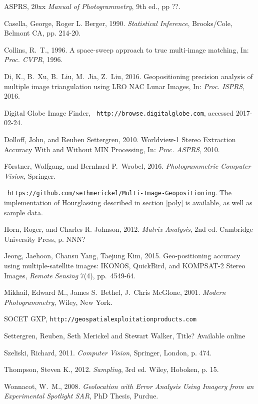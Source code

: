 \documentclass[10pt]{amsart}
\begin{document}
\begin{thebibliography}{99} %

ASPRS, 20xx {\em Manual of Photogrammetry}, 9th ed., pp ??.

 Casella, George, Roger L. Berger, 1990. {\em Statistical
  Inference}, Brooks/Cole, Belmont CA, pp. 214-20.

Collins, R.~T., 1996. A space-sweep approach to true
  multi-image matching, In: {\em Proc. CVPR}, 1996.

Di, K., B.~Xu, B.~Liu, M.~Jia, Z.~Liu, 2016. Geopositioning
  precision analysis of multiple image triangulation using LRO NAC Lunar
  Images, In: {\em Proc. ISPRS}, 2016.

Digital Globe Image Finder, {\tt
  http://browse.digitalglobe.com}, accessed 2017-02-24.

Dolloff, John, and Reuben Settergren, 2010. Worldview-1 Stereo
  Extraction Accuracy With and Without MIN Processing, In: {\em Proc. ASPRS}, 2010.

F\"orstner, Wolfgang, and Bernhard P.~Wrobel, 2016. {\em
  Photogrammetric Computer Vision}, Springer.

 {\tt
  https://github.com/sethmerickel/Multi-Image-Geopositioning}. The
  implementation of Hourglassing described in section \ref{poly} is available,
  as well as sample data.

Horn, Roger, and Charles R. Johnson, 2012. {\em Matrix
  Analysis}, 2nd ed. Cambridge University Press, p. NNN?

Jeong, Jaehoon, Chansu Yang, Taejung Kim, 2015. Geo-positioning
  accuracy using multiple-satellite images: IKONOS, QuickBird, and KOMPSAT-2
  Stereo Images, {\em Remote Sensing} 7(4), pp.~4549-64.

Mikhail, Edward M., James S.~Bethel, J.~Chris McGlone,
  2001. {\em Modern Photogrammetry}, Wiley, New York.

SOCET GXP, {\tt http://geospatialexploitationproducts.com}

Settergren, Reuben, Seth Merickel and Stewart Walker, Title?
  Available online \cite{GITHUB}

Szeliski, Richard, 2011. {\em Computer Vision}, Springer,
  London, p. 474.

Thompson, Steven K., 2012. {\em Sampling}, 3rd ed. Wiley, Hoboken,
  p. 15.

Wonnacot, W.~M., 2008. {\em Geolocation with Error Analysis
  Using Imagery from an Experimental Spotlight SAR}, PhD Thesis, Purdue.


\end{thebibliography}
 
\end{document}
